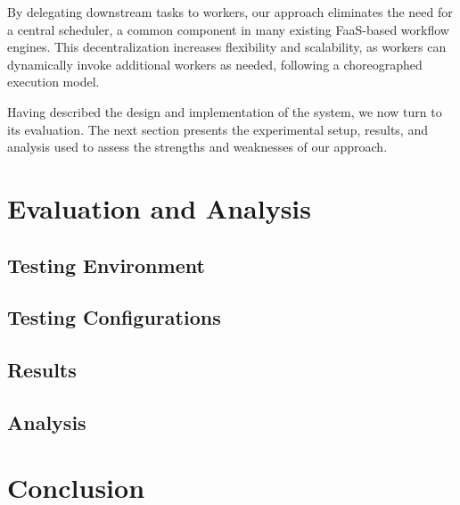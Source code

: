 \documentclass[conference]{IEEEtran}
\begin{document}
By delegating downstream tasks to workers, our approach eliminates the need for a central scheduler, a common component in many existing FaaS-based workflow engines. This decentralization increases flexibility and scalability, as workers can dynamically invoke additional workers as needed, following a choreographed execution model.

Having described the design and implementation of the system, we now turn to its evaluation. The next section presents the experimental setup, results, and analysis used to assess the strengths and weaknesses of our approach.


\section{Evaluation and Analysis}

\subsection{Testing Environment}
\subsection{Testing Configurations}
\subsection{Results}
\subsection{Analysis}


\section{Conclusion}



\end{document}

